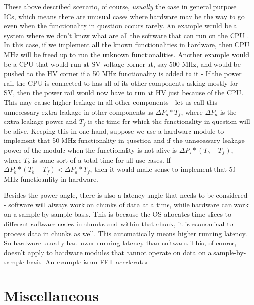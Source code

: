 These above described scenario, of course, \emph{usually} the case in general purpose ICs, which means there are unusual cases where hardware may be the way to go even when the functionality in question occurs rarely. An example would be a system where we don't know what are all the software that can run on the CPU . In this case, if we implement all the known functionalities in hardware, then CPU MHz will be freed up to run the unknown functionalities. Another example would be a CPU that would run at SV voltage corner at, say 500 MHz, and would be pushed to the HV corner if a 50 MHz functionality is added to it - If the power rail the CPU is connected to has all of its other components asking mostly for SV, then the power rail would now have to run at HV just because of the CPU. This may cause higher leakage in all other components - let us call this unnecessary extra leakage in other components as \(\Delta P_a*T_f\), where $\Delta P_a$ is the extra leakage power and $T_f$ is the time for which the functionality in question will be alive. Keeping this in one hand, suppose we use a hardware module to implement that 50 MHz functionality in question and if the unnecessary leakage power of the module when the functionality is not alive is \(\Delta P_b*(T_b-T_f)\), where $T_b$ is some sort of a total time for all  use cases. If \(\Delta P_b*(T_b-T_f) < \Delta P_a*T_f\), then it would make sense to implement that 50 MHz functioanlity in hardware.

Besides the power angle, there is also a latency angle that needs to be considered - software will always work on chunks of data at a time, while hardware can work on a sample-by-sample basis. This is because the OS allocates time slices to different software codes in chunks and within that chunk, it is economical to process data in chunks as well. This automatically means higher running latency. So hardware usually has lower running latency than software. This, of course, doesn't apply to hardware modules that cannot operate on data on a sample-by-sample basis. An example is an FFT accelerator. 

\chapter{Miscellaneous}
\label{chap:partHwMisc}
